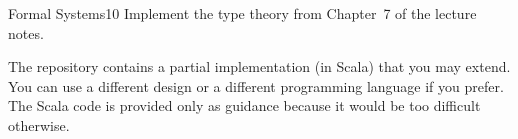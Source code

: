 \documentclass[a4paper]{article}
\begin{document}
\header

\begin{problem}{Formal Systems}{10}
Implement the type theory from Chapter~7 of the lecture notes.

The repository contains a partial implementation (in Scala) that you may extend.
You can use a different design or a different programming language if you prefer.
The Scala code is provided only as guidance because it would be too difficult otherwise.
\end{problem}
\end{document}
